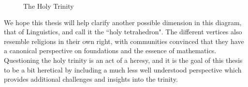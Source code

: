 \begin{figure}[H]
\centering
{}
\caption{The Holy Trinity} \label{fig:M1}
\end{figure}

We hope this thesis will help clarify another possible dimension in this
diagram, that of Linguistics, and call it the ``holy tetrahedron". The different
vertices also resemble
religions in their own right, with communities convinced that they have a
canonical perspective on foundations and the essence of mathematics. Questioning the holy trinity is an act of a heresy, and
it is the goal of this thesis to be a bit heretical by including a much less well understood 
perspective which provides additional challenges and
insights into the trinity.

